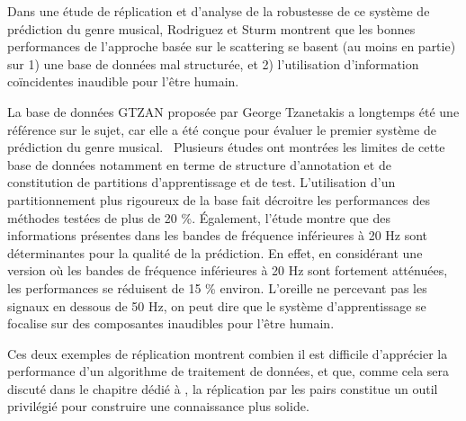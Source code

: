 Dans une étude de réplication et d'analyse de la robustesse de ce système de prédiction du genre musical, Rodriguez et Sturm montrent que les bonnes performances de l'approche basée sur le scattering se basent (au moins en partie) sur 1) une base de données mal structurée, et 2) l'utilisation d'information coïncidentes inaudible pour l'être humain.~\cite{rodriguez2016analysing}

La base de données GTZAN proposée par George Tzanetakis a longtemps été une référence sur le sujet, car elle a été conçue pour évaluer le premier système de prédiction du genre musical.~\cite{tzanetakis2002musical} Plusieurs études ont montrées les limites de cette base de données notamment en terme de structure d'annotation et de constitution de partitions d'apprentissage et de test. L'utilisation d'un partitionnement plus rigoureux de la base fait décroitre les performances des méthodes testées de plus de 20 \%. \'Egalement, l'étude montre que des informations présentes dans les bandes de fréquence inférieures à 20 Hz sont déterminantes pour la qualité de la prédiction. En effet, en considérant une version où les bandes de fréquence inférieures à 20 Hz sont fortement atténuées, les performances se réduisent de 15 \% environ. L'oreille ne percevant pas les signaux en dessous de 50 Hz, on peut dire que le système d'apprentissage se focalise sur des composantes inaudibles pour l'être humain.

Ces deux exemples de réplication montrent combien il est difficile d'apprécier la performance d'un algorithme de traitement de données, et que, comme cela sera discuté dans le chapitre dédié à , la réplication par les pairs constitue un outil privilégié pour construire une connaissance plus solide.


